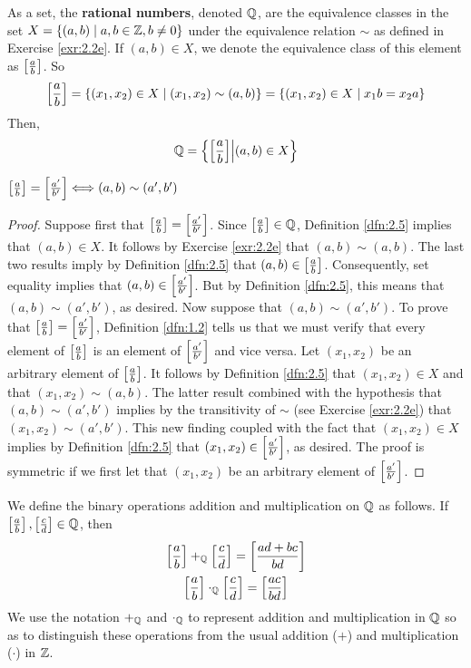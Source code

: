 \documentclass[../main.tex]{subfiles}
\begin{document}
\begin{definition}\label{dfn:2.5}
    As a set, the \textbf{rational numbers}, denoted $\mathbb{Q}$, are the equivalence classes in the set $X=\{(a,b)\mid a,b\in\mathbb{Z},b\neq 0\}$ under the equivalence relation $\sim$ as defined in Exercise \ref{exr:2.2e}. If $(a,b)\in X$, we denote the equivalence class of this element as $\left[ \frac{a}{b} \right]$. So
    \begin{equation*}
        \left[ \frac{a}{b} \right] = \{(x_1,x_2)\in X\mid(x_1,x_2)\sim(a,b)\}
        = \{(x_1,x_2)\in X\mid x_1b=x_2a\}
    \end{equation*}
    Then,
    \begin{equation*}
        \mathbb{Q} = \left\{\left[ \frac{a}{b} \right]\middle|(a,b)\in X\right\}
    \end{equation*}
\end{definition}

\begin{exercise}\label{exr:2.6}
    $\left[ \frac{a}{b} \right]=\left[ \frac{a'}{b'} \right]\Longleftrightarrow(a,b)\sim(a',b')$
    \begin{proof}
        Suppose first that $\left[ \frac{a}{b} \right]=\left[ \frac{a'}{b'} \right]$. Since $\left[ \frac{a}{b} \right]\in\mathbb{Q}$, Definition \ref{dfn:2.5} implies that $(a,b)\in X$. It follows by Exercise \ref{exr:2.2e} that $(a,b)\sim(a,b)$. The last two results imply by Definition \ref{dfn:2.5} that $(a,b)\in\left[ \frac{a}{b} \right]$. Consequently, set equality implies that $(a,b)\in\left[ \frac{a'}{b'} \right]$. But by Definition \ref{dfn:2.5}, this means that $(a,b)\sim(a',b')$, as desired. Now suppose that $(a,b)\sim(a',b')$. To prove that $\left[ \frac{a}{b} \right]=\left[ \frac{a'}{b'} \right]$, Definition \ref{dfn:1.2} tells us that we must verify that every element of $\left[ \frac{a}{b} \right]$ is an element of $\left[ \frac{a'}{b'} \right]$ and vice versa. Let $(x_1,x_2)$ be an arbitrary element of $\left[ \frac{a}{b} \right]$. It follows by Definition \ref{dfn:2.5} that $(x_1,x_2)\in X$ and that $(x_1,x_2)\sim(a,b)$. The latter result combined with the hypothesis that $(a,b)\sim(a',b')$ implies by the transitivity of $\sim$ (see Exercise \ref{exr:2.2e}) that $(x_1,x_2)\sim(a',b')$. This new finding coupled with the fact that $(x_1,x_2)\in X$ implies by Definition \ref{dfn:2.5} that $(x_1,x_2)\in\left[ \frac{a'}{b'} \right]$, as desired. The proof is symmetric if we first let that $(x_1,x_2)$ be an arbitrary element of $\left[ \frac{a'}{b'} \right]$.
    \end{proof}
\end{exercise}

\begin{definition}\label{dfn:2.7}
    We define the binary operations addition and multiplication on $\mathbb{Q}$ as follows. If $\left[ \frac{a}{b} \right],\left[ \frac{c}{d} \right]\in\mathbb{Q}$, then
    \begin{gather*}
        \left[ \frac{a}{b} \right]+_{\mathbb{Q}}\left[ \frac{c}{d} \right] = \left[ \frac{ad+bc}{bd} \right]\\
        \left[ \frac{a}{b} \right]\cdot_{\mathbb{Q}}\left[ \frac{c}{d} \right] = \left[ \frac{ac}{bd} \right]
    \end{gather*}
    We use the notation $+_{\mathbb{Q}}$ and $\cdot_{\mathbb{Q}}$ to represent addition and multiplication in $\mathbb{Q}$ so as to distinguish these operations from the usual addition ($+$) and multiplication ($\cdot$) in $\mathbb{Z}$.
\end{definition}
\end{document}
